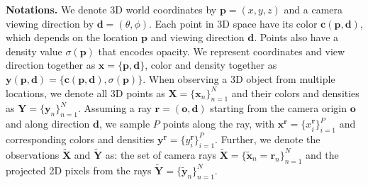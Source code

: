 

\noindent \textbf{Notations.}
%
We denote 3D world coordinates by \(\mathbf{p} = (x, y, z)\) and a camera viewing direction by \(\mathbf{d} = (\theta, \phi)\). Each point in 3D space have its color \(\mathbf{c}(\mathbf{p}, \mathbf{d})\), which depends on the location \(\mathbf{p}\) and viewing direction \(\mathbf{d}\). Points also have a density value \(\sigma(\mathbf{p})\) that encodes opacity. We represent coordinates and view direction together as $\mathbf{x} = \{\mathbf{p},\mathbf{d} \}$, color and density together as \(\mathbf{y}(\mathbf{p}, \mathbf{d}) = \{\mathbf{c}(\mathbf{p}, \mathbf{d}), \sigma(\mathbf{p})\}\).
When observing a 3D object from multiple locations, we denote all 3D points as \(\mathbf{X} = \{\mathbf{x}_n \}_{n=1}^N\) and their colors and densities as \(\mathbf{Y} = \{\mathbf{y}_n\}_{n=1}^N\).
Assuming a ray \(\mathbf{r} = (\mathbf{o}, \mathbf{d})\) starting from the camera origin \(\mathbf{o}\) and along direction \(\mathbf{d}\), we sample $P$ points along the ray, with \(\mathbf{x}^{\mathbf{r}} = \{{x}_i^\mathbf{r}\}_{i=1}^P\) and corresponding colors and densities \(\mathbf{y}^{\mathbf{r}} = \{{y}_i^{\mathbf{r}}\}_{i=1}^P\). Further, we denote the observations \(\widetilde{\mathbf{X}}\) and \(\widetilde{\mathbf{Y}}\) as: the set of camera rays \(\widetilde{\mathbf{X}} = \{\widetilde{\mathbf{x}}_n = \mathbf{r}_n\}_{n=1}^N\) and the projected 2D pixels from the rays \(\widetilde{\mathbf{Y}} = \{\widetilde{\mathbf{y}}_n\}_{n=1}^N\).



